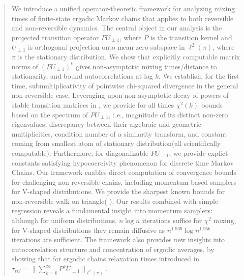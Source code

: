 \documentclass[preprint]{imsart}
\theoremstyle{plain}
\theoremstyle{definition}
\begin{document}
\begin{frontmatter}
\begin{abstract}
We introduce a unified operator-theoretic framework for analyzing mixing times of finite-state ergodic Markov chains that applies to both reversible and non-reversible dynamics. The central object in our analysis is the projected transition operator $PU_{\perp 1}$, where $P$ is the transition kernel and $U_{\perp 1}$ is orthogonal projection onto mean-zero subspace in $\ell^{2}(\pi)$, where $\pi$ is the stationary distribution.  We show that explicitly computable matrix norms of $(PU_{\perp 1})^k$ gives non-asymptotic mixing times/distance to stationarity, and bound autocorrelations at lag $k$. We establish, for the first time, submultiplicativity of pointwise chi-squared divergence in the general non-reversible case. Leveraging upon non-asymptotic decay of powers of stable transition matrices in \cite{naeem2023spectral}, we provide for all times $\chi^{2}(k)$ bounds based on the spectrum of $PU_{\perp 1}$, i.e., magnitude of its distinct non-zero eigenvalues, discrepancy between their algebraic and geometric multiplicities, condition number of a similarity transform, and constant coming from smallest atom of stationary distribution(all  scientifically computable). Furthermore, for diagonalizable $PU_{\perp 1}$, we provide explict constants satisfying hypocoercivity phenomenon\cite{villani2006hypocoercivity} for discrete time Markov Chains. Our framework enables direct computation of convergence bounds for challenging non-reversible chains, including momentum-based samplers for V-shaped distributions. We provide the sharpest known bounds for non-reversible walk on triangle( \cite{choi2020metropolis,montenegro2006mathematical}). Our results combined with simple regression reveals a fundamental insight into momentum samplers: although for uniform distributions, $n\log{n}$ iterations suffice for $\chi^{2}$ mixing, for V-shaped distributions they remain diffusive as $n^{1.969}\log{n^{1.956}}$ iterations are sufficient. The framework also provides new insights into autocorrelation structure and concentration of ergodic averages, by showing that for ergodic chains relaxation times introduced in \cite{chatterjee2023spectral} $\tau_{rel}=\|\sum_{k=0}^{\infty}P^{k}U_{\perp 1}\|_{\ell^{2}(\pi)}$. 
\end{abstract}

\end{frontmatter}
\end{document}
